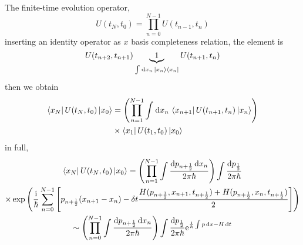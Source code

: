 The finite-time evolution operator,
\begin{equation}
  U(t_N, t_0) = \prod_{n=0}^{N-1} U(t_{n-1},t_n)
\end{equation}
inserting an identity operator as $x$ basis completeness relation,
the element is 
\begin{equation}
  U(t_{n+2},t_{n+1}) \underbrace{{1}}_{\int_{}^{} \mathrm{d}x_n \, \ket{x_n}\bra{x_n} } U(t_{n+1},t_{n})
\end{equation}
then we obtain
\begin{equation}
  \begin{aligned}
    \bra{x_N}U(t_N, t_0)\ket{x_0}
    & = \left( \prod_{n=1}^{N-1} \int_{}^{} \mathrm{d}x_n \, \bra{x_{n+1}}U(t_{n+1},t_{n}) \ket{x_n}  \right) 
    \\
    & \times \bra{x_1}U(t_1,t_0)\ket{x_0}
    \end{aligned}  
\end{equation}
in full,
\begin{equation}
  \begin{gathered}
    \bra{x_N}U(t_N, t_0)\ket{x_0}
    =\left( \prod_{n=1}^{N-1} \int \frac{\mathrm{d} p_{n+ \frac{1}{2}} \, \mathrm{d} x_n}{2\pi \hbar} \right) \int \frac{\mathrm{d} p_{\frac{1}{2}}}{2\pi \hbar} 
    \\
    \times \exp \left( \frac{\mathrm{i} }{\hbar} \sum_{n=0}^{N-1} \left[ p_{n+ \frac{1}{2}}(x_{n+1}-x_n) - \delta t  \frac{H(p_{n+ \frac{1}{2}},x_{n+1}, t_{n+ \frac{1}{2}})+H(p_{n+ \frac{1}{2}},x_{n}, t_{n+ \frac{1}{2}}) }{2}\right]  \right) 
    \\
    \sim \left( \prod_{n=0}^{N-1} \int \frac{\mathrm{d} p_{n+ \frac{1}{2}} \, \mathrm{d} x_n}{2\pi \hbar} \right) \int \frac{\mathrm{d} p_{\frac{1}{2}}}{2\pi \hbar} \mathrm{e}^{\frac{\mathrm{i} }{\hbar} \int p\, \mathrm{d} x - H \, \mathrm{d} t}
  \end{gathered}
\end{equation}
